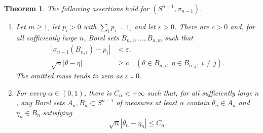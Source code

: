 \documentclass[10pt,a4paper]{amsart}
\numberwithin{equation}{section}
\newtheorem{theorem}{Theorem}[section]
\newcommand{\eps}{\varepsilon}
\begin{document}
\begin{theorem}\label{thm:spherical-blocks-nearby}
The following assertions hold for $(S^{n-1},\sigma_{n-1})$.
\begin{enumerate}[label=\textup{(\alph*)}]
\item Let $m\ge1$, let $p_i>0$ with $\sum_i p_i=1$, and let $\eps>0$.  There are $c>0$ and, for all sufficiently large $n$, Borel sets $B_{n,1},\ldots,B_{n,m}$ such that
\begin{align}
|\sigma_{n-1}(B_{n,i})-p_i|&<\eps, \label{eq:spherical-block-masses}\\
 \sqrt n|\theta-\eta|&\ge c
 \quad(\theta\in B_{n,i},\ \eta\in B_{n,j},\ i\ne j).
 \label{eq:spherical-block-separation}
\end{align}
The omitted mass tends to zero as $\eps\downarrow0$.
\item For every $\alpha\in(0,1)$, there is $C_\alpha<+\infty$ such that, for all sufficiently large $n$, any Borel sets $A_n,B_n\subset S^{n-1}$ of measures at least $\alpha$ contain $\theta_n\in A_n$ and $\eta_n\in B_n$ satisfying
\begin{equation}\label{eq:spherical-nearby-points} \sqrt n|\theta_n-\eta_n|\le C_\alpha. \end{equation}
\end{enumerate}
\end{theorem}
\end{document}
